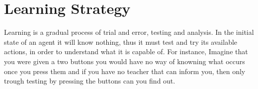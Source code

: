 \documentclass[master.tex]{subfiles}
\begin{document}
	\begin{comment}
	
	    \section*{Sec1}
	
	    Learning has two important steps to it, the first is figuring out
	    what to do in order to learn about something and the second is analysis
	    of what occured to understand and actually learn about it.
	
	    
	    Analysing an outcome is about figuring out what occured and what did
	    not occur. For instance if one pressed
	
	    In a STRIPS domain, all actions are absolute thus we know that if
	    an action changed the state then the action's preconditions was satisfied
	    and all predicates added
    \end{comment}



    \section*{Learning Strategy}

    Learning is a gradual process of trial and error, testing and analysis.
    In the initial state of an agent it will know nothing, thus it must
    test and try its available actions, in order to understand what it
    is capable of. For instance, Imagine that you were given a two buttons
    you would have no way of knowning what occurs once you press them
    and if you have no teacher that can inform you, then only trough testing
    by pressing the buttons can you find out.
    
\end{document}
